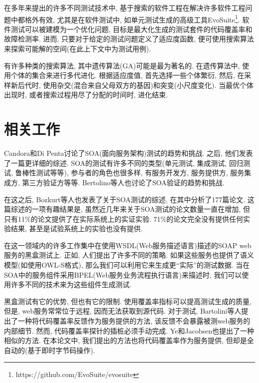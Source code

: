         在多年来提出的许多不同测试技术中, 基于搜索的软件工程在解决许多软件工程问题中都格外有效, 尤其是在软件测试中, 如单元测试生成的高级工具EvoSuite\footnote{ https://github.com/EvoSuite/evosuite}. 软件测试可以被建模为一个优化问题, 目标是最大化生成的测试套件的代码覆盖率和故障检测率. 进而, 只要对于给定的测试问题定义了适应度函数, 便可使用搜索算法来探索可能解的空间(在此上下文中为测试用例). 
        
        有许多种类的搜索算法, 其中遗传算法(GA)可能是最为著名的. 在遗传算法中, 使用个体的集合来进行多代进化. 根据适应度值, 首先选择一些个体繁衍, 然后, 在采样新后代时, 使用杂交(混合来自父母双方的基因)和突变(小尺度变化). 当最优个体出现时, 或者搜索过程用尽了分配的时间时, 进化结束.

\section{相关工作}
  Candora和Di Penta讨论了SOA(面向服务架构)测试的趋势和挑战. 之后, 他们发表了一篇更详细的综述. SOA的测试有许多不同的类型(单元测试, 集成测试, 回归测试, 鲁棒性测试等等), 参与者的角色也很多样, 有服务开发方, 服务提供方, 服务集成方, 第三方验证方等等. Bertolino等人也讨论了SOA验证的趋势和挑战. 
    
    在这之后, Bozkurt等人也发表了关于SOA测试的综述, 在其中分析了177篇论文. 这篇综述的一项有趣结果是, 虽然近几年来关于SOA测试的论文数量一直在增加, 但只有11\%的论文提供了在实际系统上的实证实验. 71\%的论文完全没有提供任何实验结果, 甚至是试验系统上的实验也没有提供. 
    
    在这一领域内的许多工作集中在使用WSDL(Web服务描述语言)描述的SOAP web服务的黑盒测试上. 正如, 人们提出了许多不同的策略. 如果这些服务也提供了语义模型(如使用OWL-S格式), 那么我们可以利用它来生成更“实际”的测试数据. 当在SOA中的服务组件采用BPEL(Web服务业务流程执行语言)来描述时, 我们可以使用许多不同的技术来为这些组件生成测试. 
    
    黑盒测试有它的优势, 但也有它的限制. 使用覆盖率指标可以提高测试生成的质量, 但是, web服务常常位于远程, 因而无法获取到源代码. 对于测试, Bartolini等人提出了一种将代码覆盖率反馈作为服务提供的方法, 该反馈不会暴露被测web服务的内部细节. 然而, 代码覆盖率探针的插桩必须手动完成. Ye和Jacobsen也提出了一种相似的方法. 在本论文中, 我们提出的方法也将代码覆盖率作为服务提供, 但却是全自动的(基于即时字节码操作). 
    
